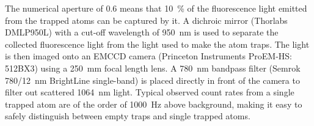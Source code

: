 \documentclass[../Thesis-IJspeert.tex]{subfiles}
\begin{document}
The numerical aperture of \num{0.6} means that \SI{10}{\percent} of the fluorescence light emitted from the trapped atoms can be captured by it. A dichroic mirror (Thorlabs DMLP950L) with a cut-off wavelength of \SI{950}{\nm} is used to separate the collected fluorescence light from the light used to make the atom traps. The light is then imaged onto an EMCCD camera (Princeton Instruments ProEM-HS: 512BX3) using a \SI{250}{\mm} focal length lens. A \SI{780}{\nm} bandpass filter (Semrok \num{780}/\SI{12}{\nm} BrightLine single-band) is placed directly in front of the camera to filter out scattered \SI{1064}{\nm} light. Typical observed count rates from a single trapped atom are of the order of \SI{1000}{Hz} above background, making it easy to safely distinguish between empty traps and single trapped atoms.

\fi


\end{document}
